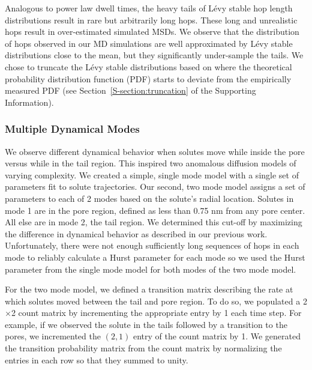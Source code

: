 \documentclass{article}
\begin{document}
  Analogous to power law dwell times, the heavy tails of L\'evy stable 
  hop length distributions result in rare but arbitrarily long hops. These long
  and unrealistic hops result in over-estimated simulated MSDs. We observe that
  the distribution of hops observed in our MD simulations are well approximated 
  by L\'evy stable distributions close to the mean, but they significantly under-sample
  the tails. We chose to truncate the L\'evy stable distributions based
  on where the theoretical probability distribution function (PDF) starts to 
  deviate from the empirically measured PDF (see Section~\ref{S-section:truncation}
  of the Supporting Information).
  

  \subsubsection*{Multiple Dynamical Modes}
  
  We observe different dynamical behavior when solutes move while inside 
  the pore versus while in the tail region. This inspired two anomalous diffusion 
  models of varying complexity. We created a simple, single mode model with a single 
  set of parameters fit to solute trajectories.
  Our second, two mode model assigns a set of parameters to each of 2 modes based
  on the solute's radial location. Solutes in mode 1 are in the pore region, defined
  as less than 0.75 nm from any pore center. All else are in mode 2, the tail region. 
  We determined this cut-off by maximizing the difference in dynamical behavior as 
  described in our previous work.~\cite{coscia_chemically_2019} Unfortunately, 
  there were not enough sufficiently long sequences of hops in each mode to reliably
  calculate a Hurst parameter for each mode so we used the Hurst parameter from the 
  single mode model for both modes of the two mode model.
  
 
  For the two mode model, we defined a transition matrix describing the rate at
  which solutes moved between the tail and pore region. To do so, we populated a
  2$\times$2 count matrix by incrementing the appropriate entry by 1 each time step. 
  For example, if we observed the solute in the tails followed by a transition to 
  the pores, we incremented the $(2, 1)$ entry of the count matrix by 1. We generated
  the transition probability matrix from the count matrix by normalizing the 
  entries in each row so that they summed to unity.
 
\end{document}
